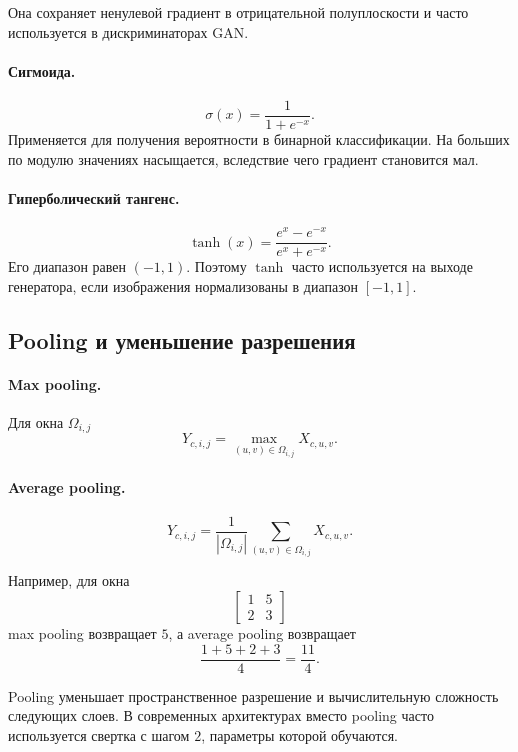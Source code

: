 \documentclass[12pt,a4paper]{article}
\numberwithin{equation}{section}
\theoremstyle{definition}
\theoremstyle{remark}
\begin{document}
Она сохраняет ненулевой градиент в отрицательной полуплоскости и часто
используется в дискриминаторах GAN.

\paragraph{Сигмоида.}
\[
    \sigma(x)=\frac{1}{1+e^{-x}}.
\]
Применяется для получения вероятности в бинарной классификации.
На больших по модулю значениях насыщается, вследствие чего градиент
становится мал.

\paragraph{Гиперболический тангенс.}
\[
    \tanh(x)
    =
    \frac{e^x-e^{-x}}{e^x+e^{-x}}.
\]
Его диапазон равен \((-1,1)\). Поэтому \(\tanh\) часто используется на
выходе генератора, если изображения нормализованы в диапазон
\([-1,1]\).

\subsection{Pooling и уменьшение разрешения}

\paragraph{Max pooling.}
Для окна \(\Omega_{i,j}\)
\[
    Y_{c,i,j}
    =
    \max_{(u,v)\in\Omega_{i,j}}X_{c,u,v}.
\]

\paragraph{Average pooling.}
\[
    Y_{c,i,j}
    =
    \frac{1}{|\Omega_{i,j}|}
    \sum_{(u,v)\in\Omega_{i,j}}X_{c,u,v}.
\]

Например, для окна
\[
    \begin{bmatrix}
        1&5\\
        2&3
    \end{bmatrix}
\]
max pooling возвращает \(5\), а average pooling возвращает
\[
    \frac{1+5+2+3}{4}=\frac{11}{4}.
\]

Pooling уменьшает пространственное разрешение и вычислительную
сложность следующих слоев. В современных архитектурах вместо pooling
часто используется свертка с шагом \(2\), параметры которой обучаются.
\end{document}
